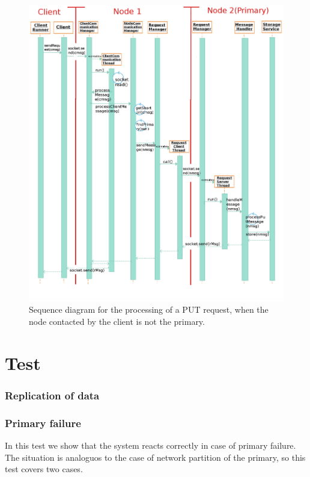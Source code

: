 \documentclass{article}
\begin{document}
\begin{figure}[h]
\centering
\includegraphics[scale=0.32]{sequence_diagram_complete}
\caption{Sequence diagram for the processing of a PUT request, when the node contacted by the client is not the primary.}
\label{fig:sequence_diagram_complete}
\end{figure}


\section{Test}

\subsubsection{Replication of data}


\subsubsection{Primary failure} 
In this test we show that the system reacts correctly in case of primary failure. The situation is analoguos to the case of network partition of the primary, so this test covers two cases. 
\end{document}
